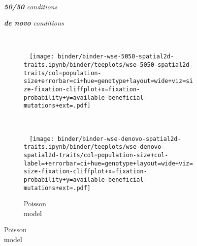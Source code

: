 \begin{figure}[h]
  \captionsetup[subfigure]{justification=raggedright}
  \begin{minipage}{\textwidth}

    \begin{minipage}{0.1\textwidth}~\end{minipage}%
    \begin{minipage}{0.35\textwidth}
      \centering
      \itshape
      {\large
      \textbf{50/50} conditions
      }
    \end{minipage}%
    \begin{minipage}{0.45\textwidth}
      \centering
      \itshape
      {\large
      \textbf{de novo} conditions
      }
    \end{minipage}

    ~\vspace{-0.7ex}

    \begin{subfigure}[b]{\linewidth}
        \begin{minipage}{0.42\textwidth}
          ~
          \texttt{[image: binder/binder-wse-5050-spatial2d-traits.ipynb/binder/teeplots/wse-5050-spatial2d-traits/col=population-size+errorbar=ci+hue=genotype+layout=wide+viz=size-fixation-cliffplot+x=fixation-probability+y=available-beneficial-mutations+ext=.pdf]}%
        \end{minipage}%
        \begin{minipage}{0.06\textwidth}
          ~
        \end{minipage}%
        \begin{minipage}{0.38\textwidth}
          ~
          \texttt{[image: binder/binder-wse-denovo-spatial2d-traits.ipynb/binder/teeplots/wse-denovo-spatial2d-traits/col=population-size+col-label=+errorbar=ci+hue=genotype+layout=wide+viz=size-fixation-cliffplot+x=fixation-probability+y=available-beneficial-mutations+ext=.pdf]}%
        \end{minipage}%
      \begin{minipage}{0.12\textwidth}
        \raggedright
        \large
        \caption{Poisson\\ model}
        \label{fig:denovo-5050-conditions:poisson}
        \vspace{20ex}
      \end{minipage}%
    \end{subfigure}%


\end{minipage}
\end{figure}
